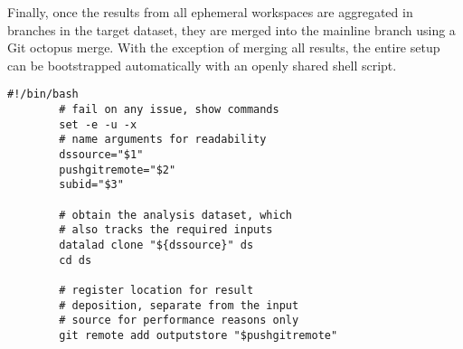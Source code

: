 Finally, once the results from all ephemeral workspaces are aggregated in branches in the target dataset, they are merged into the mainline branch using a Git octopus merge.
With the exception of merging all results, the entire setup can be bootstrapped automatically with an openly shared shell script.





\begin{Listing}
	\centering
	\begin{lstlisting}[multicols=2]
		#!/bin/bash
		# fail on any issue, show commands
		set -e -u -x
		# name arguments for readability
		dssource="$1"
		pushgitremote="$2"
		subid="$3"

		# obtain the analysis dataset, which
		# also tracks the required inputs
		datalad clone "${dssource}" ds
		cd ds

		# register location for result
		# deposition, separate from the input
		# source for performance reasons only
		git remote add outputstore "$pushgitremote"


\end{lstlisting}
\end{Listing}
